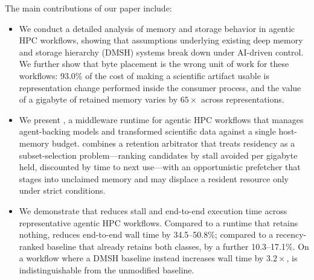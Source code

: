\medskip
\noindent The main contributions of our paper include:

\begin{itemize}

\item We conduct a detailed analysis of memory and storage behavior in agentic
HPC workflows, showing that assumptions underlying existing deep memory and
storage hierarchy (DMSH) systems break down under AI-driven control. We
further show that byte placement is the wrong unit of work for these
workflows: 93.0\% of the cost of making a scientific artifact usable is
representation change performed inside the consumer process, and the value of
a gigabyte of retained memory varies by $65\times$ across representations.

\item We present \sysname, a middleware runtime for agentic HPC workflows that
manages agent-backing models and transformed scientific data against a single
host-memory budget. \sysname combines a retention arbitrator that treats
residency as a subset-selection problem---ranking candidates by stall avoided
per gigabyte held, discounted by time to next use---with an opportunistic
prefetcher that stages into unclaimed memory and may displace a resident
resource only under strict conditions.

\item We demonstrate that \sysname reduces stall and end-to-end execution time
across representative agentic HPC workflows. Compared to a runtime that
retains nothing, \sysname reduces end-to-end wall time by 34.5--50.8\%;
compared to a recency-ranked baseline that already retains both classes, by a
further 10.3--17.1\%. On a workflow where a DMSH baseline instead increases
wall time by $3.2\times$, \sysname is indistinguishable from the unmodified
baseline.

\end{itemize}
